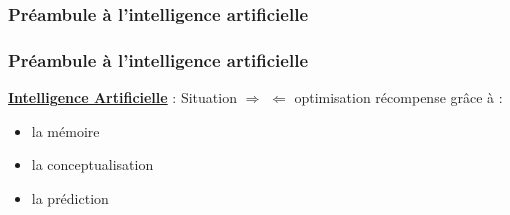 \begin{frame}
  \frametitle{Préambule à l'intelligence artificielle}
  \begin{center}
    \huge{}
  \end{center}
\end{frame}

\begin{frame}
  \frametitle{Préambule à l'intelligence artificielle}
  \underline{\textbf{Intelligence Artificielle}} :
  \newline
  \newline
  Situation $\Rightarrow$  $\Leftarrow$ optimisation récompense
  \newline
  grâce à :
  \begin{itemize}
  \item la mémoire
  \item la conceptualisation
  \item la prédiction
  \end{itemize}
\end{frame}
